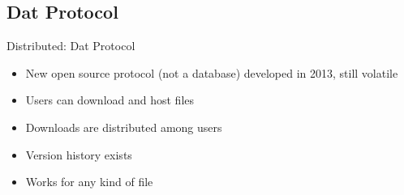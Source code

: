 \documentclass{beamer}
\begin{document}
    \subsection{Dat Protocol}
    \begin{frame}{Distributed: Dat Protocol}
        \begin{itemize}
            \item New open source protocol (not a database) developed in 2013, still volatile
            \item Users can download and host files
            \item Downloads are distributed among users
            \item Version history exists
            \item Works for any kind of file
        \end{itemize}
    \end{frame}
        
\end{document}
